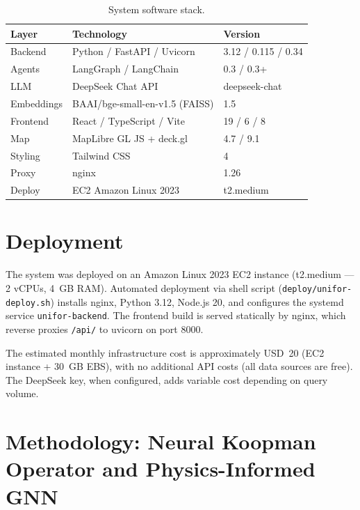 \documentclass[preprint,12pt,times,numbers]{elsarticle}
\begin{document}
\begin{table}[htbp]
\centering
\caption{System software stack.}
\label{tab:software-stack}
\small
\begin{tabular}{@{}lll@{}}
\toprule
\textbf{Layer} & \textbf{Technology} & \textbf{Version} \\
\midrule
Backend & Python / FastAPI / Uvicorn & 3.12 / 0.115 / 0.34 \\
Agents & LangGraph / LangChain & 0.3 / 0.3+ \\
LLM & DeepSeek Chat API & deepseek-chat \\
Embeddings & BAAI/bge-small-en-v1.5 (FAISS) & 1.5 \\
Frontend & React / TypeScript / Vite & 19 / 6 / 8 \\
Map & MapLibre GL JS + deck.gl & 4.7 / 9.1 \\
Styling & Tailwind CSS & 4 \\
Proxy & nginx & 1.26 \\
Deploy & EC2 Amazon Linux 2023 & t2.medium \\
\bottomrule
\end{tabular}
\end{table}

\section{Deployment}
\label{sec:deploy}

The system was deployed on an Amazon Linux 2023 EC2 instance (t2.medium --- 2 vCPUs, 4~GB RAM). Automated deployment via shell script (\texttt{deploy/unifor-deploy.sh}) installs nginx, Python 3.12, Node.js 20, and configures the systemd service \texttt{unifor-backend}. The frontend build is served statically by nginx, which reverse proxies \texttt{/api/} to uvicorn on port 8000.

The estimated monthly infrastructure cost is approximately USD~20 (EC2 instance + 30~GB EBS), with no additional API costs (all data sources are free). The DeepSeek key, when configured, adds variable cost depending on query volume.

\section{Methodology: Neural Koopman Operator and Physics-Informed GNN}
\label{sec:methodology}
\end{document}
